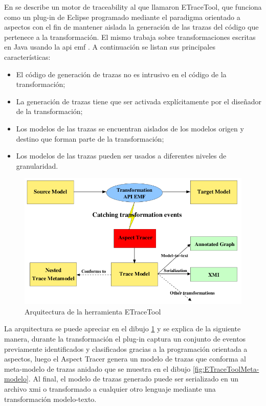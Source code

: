 \documentclass[a4paper,12pt,oneside,spanish]{book}
\begin{document}
En \cite{AmarLeblancCoulette} se describe un motor de traceability al que llamaron ETraceTool, que funciona como un plug-in de Eclipse programado mediante el paradigma orientado a aspectos con el fin de mantener aislada la generación de las trazas del código que pertenece a la transformación. El mismo trabaja sobre transformaciones escritas en Java usando la \gls{api} \gls{emf} \cite{EMF}. A continuación se listan sus principales características:

\begin{itemize}
\item El código de generación de trazas no es intrusivo en el código de la transformación;
\item La generación de trazas tiene que ser activada explícitamente por el diseñador de la transformación;
\item Los modelos de las trazas se encuentran aislados de los modelos origen y destino que forman parte de la transformación;
\item Los modelos de las trazas pueden ser usados a diferentes niveles de granularidad.
\end{itemize}

\begin{figure}[hbtp]
\centering
\includegraphics[scale=0.5]{./img/ETraceTool_Arquitectura}
\caption{Arquitectura de la herramienta ETraceTool}
\label{fig:ArqETraceTool}
\end{figure}

La arquitectura se puede apreciar en el dibujo \ref{fig:ArqETraceTool} y se explica de la siguiente manera, durante la transformación el plug-in captura un conjunto de eventos previamente identificados y clasificados gracias a la programación orientada a aspectos, luego el Aspect Tracer genera un modelo de trazas que conforma al meta-modelo de trazas anidado que se muestra en el dibujo \ref{fig:ETraceToolMeta-modelo}. Al final, el modelo de trazas generado puede ser serializado en un archivo \gls{xmi} o transformado a cualquier otro lenguaje mediante una transformación modelo-texto.
\end{document}
